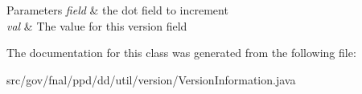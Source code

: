 \begin{DoxyParams}{Parameters}
{\em field} & the dot field to increment \\
\hline
{\em val} & The value for this version field \\
\hline
\end{DoxyParams}


The documentation for this class was generated from the following file\-:\begin{DoxyCompactItemize}
\item 
src/gov/fnal/ppd/dd/util/version/Version\-Information.\-java\end{DoxyCompactItemize}
